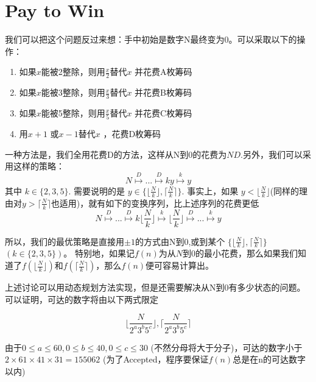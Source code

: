 \section{Pay to Win}
我们可以把这个问题反过来想：手中初始是数字N最终变为0。可以采取以下的操作：

\begin{enumerate}
    \item 如果\( x \)能被2整除，则用\(\frac{x}{2} \)替代\(x\) 并花费A枚筹码
    \item 如果\( x \)能被3整除，则用\(\frac{x}{3} \)替代\(x\) 并花费B枚筹码
    \item 如果\( x \)能被5整除，则用\(\frac{x}{5} \)替代\(x\) 并花费C枚筹码
    \item 用\(x+1\) 或\(x-1\)替代\(x\) ，花费D枚筹码 
\end{enumerate}

一种方法是，我们全用花费D的方法，这样从N到0的花费为\(ND\).另外，我们可以采用这样的策略：
\[ N \stackrel{D}{\longmapsto}...\stackrel{D}{\longmapsto}ky \stackrel{k}{\longmapsto} y\]
其中 \( k \in \{2,3,5\}\).
需要说明的是 
\( y \in \{ \lfloor \frac{N}{k} \rfloor, \lceil \frac{N}{k} \rceil\}\).
事实上，如果 \(y<\lfloor \frac{N}{k} \rfloor\)(同样的理由对\(y>\lceil \frac{N}{k} \rceil \)也适用)，就有如下的变换序列，比上述序列的花费更低
\[ N \stackrel{D}{\longmapsto}...\stackrel{D}{\longmapsto} k\lfloor \frac{N}{k} \rfloor \stackrel{k}{\longmapsto}  \lfloor \frac{N}{k} \rfloor \stackrel{D}{\longmapsto}... \stackrel{k}{\longmapsto} y\]

所以，我们的最优策略是直接用\(\pm1\)的方式由N到0,或到某个
\( \{ \lfloor \frac{N}{k} \rfloor, \lceil \frac{N}{k} \rceil\}\)
\((k \in \{2,3,5\})\)。
特别地，如果记\( f(n) \)为从\(N\)到0的最小花费，那么如果我们知道了\(f( \lfloor \frac{N}{k} \rfloor)\)和\( f( \lceil \frac{N}{k} \rceil)\)，那么\(f(n)\)便可容易计算出。

上述讨论可以用动态规划方法实现，但是还需要解决从N到0有多少状态的问题。可以证明，可达的数字将由以下两式限定

\[ \lfloor \frac{N}{2^a3^b5^c} \rfloor , \lceil \frac{N}{2^a3^b5^c} \rceil \]

由于\( 0 \leq a \leq 60, 0 \leq b \leq 40 , 0 \leq c \leq 30 \)
(不然分母将大于分子)，可达的数字小于\(2\times 61 \times 41 \times 31= 155062\)
(为了Accepted，程序要保证\(f(n)\)总是在n的可达数字以内)



